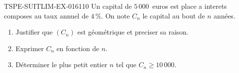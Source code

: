 \begin{exercice}{TSPE-SUITLIM-EX-016}{1}{10}
Un capital de $5\,000$~euros est place a interets composes au taux annuel de $4\,\%$. On note $C_n$ le capital au bout de $n$ années.
\begin{enumerate}
  \item Justifier que $(C_n)$ est géométrique et preciser sa raison.
  \item Exprimer $C_n$ en fonction de $n$.
  \item Déterminer le plus petit entier $n$ tel que $C_n \geq 10\,000$.
\end{enumerate}
\end{exercice}
